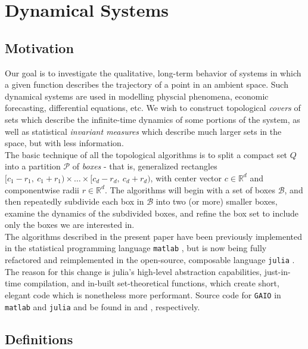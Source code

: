 \section{Dynamical Systems}


\subsection{Motivation}\label{sec:mot}

Our goal is to investigate the qualitative, long-term behavior of systems in which a given 
function describes the trajectory of a point in an ambient space. Such dynamical systems 
are used in modelling physcial phenomena, economic forecasting, differential equations, etc. 
We wish to construct topological \emph{covers} of sets which describe the infinite-time 
dynamics of some portions of the system, as well as statistical \emph{invariant measures} 
which describe much larger sets in the space, but with less information. \\

The basic technique of all the topological algorithms is to split a compact set $Q$ into 
a partition $\mathcal{P}$ of \emph{boxes} - that is, generalized rectangles
$[c_1 - r_1,\ c_1 + r_1) \times \ldots \times [c_d - r_d,\ c_d + r_d)$, with 
center vector $c \in \mathbb{R}^d$ and componentwise radii $r \in \mathbb{R}^d$. 
The algorithms will begin with a set of boxes 
$\mathcal{B}$, and then repeatedly subdivide each box in $\mathcal{B}$ into two (or more) 
smaller boxes, examine the dynamics of the subdivided boxes, and refine the box set to 
include only the boxes we are interested in. \\

The algorithms described in the present paper have been previously implemented in the 
statistical programming language \texttt{matlab} \cite*{matlab}, but is now being fully refactored and
reimplemented in the open-source, composable language \texttt{julia} \cite*{julia}. The reason for this 
change is julia's high-level abstraction capabilities, just-in-time compilation, and 
in-built set-theoretical functions, which create short, elegant code which is nonetheless 
more performant. Source code for \texttt{GAIO} in \texttt{matlab} and \texttt{julia} and be 
found in \cite*{oldGAIO} and \cite*{GAIO}, respectively.

\subsection{Definitions}

